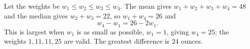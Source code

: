 Let the weights be $w_1\le w_2\le w_3\le w_4$. The mean gives $w_1+w_2+w_3+w_4=48$ and the median gives $w_2+w_3=22$, so $w_1+w_4=26$ and
\[
w_4-w_1=26-2w_1 .
\]
This is largest when $w_1$ is as small as possible, $w_1=1$, giving $w_4=25$; the weights $1,11,11,25$ are valid. The greatest difference is $\boxed{24}$ ounces.
